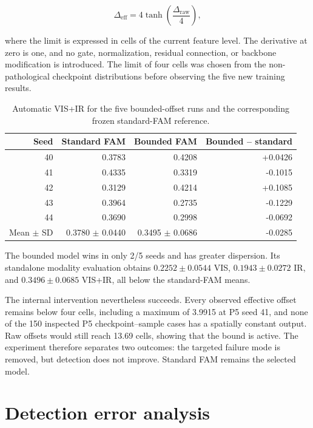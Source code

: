 \begin{equation}
  \Delta_{\mathrm{eff}}=4\tanh\!\left(\frac{\Delta_{\mathrm{raw}}}{4}\right),
  \label{eq:bounded-offset}
\end{equation}

where the limit is expressed in cells of the current feature level. The
derivative at zero is one, and no gate, normalization, residual connection, or
backbone modification is introduced. The limit of four cells was chosen from
the non-pathological checkpoint distributions before observing the five new
training results.

\begin{table}[htbp]
  \centering
  \caption{Automatic VIS+IR \mapfifty{} for the five bounded-offset runs and
  the corresponding frozen standard-FAM reference.}
  \label{tab:bounded-raw}
  \begin{tabular}{rrrr}
    \toprule
    Seed & Standard FAM & Bounded FAM & Bounded -- standard \\
    \midrule
    40 & 0.3783 & 0.4208 & +0.0426 \\
    41 & 0.4335 & 0.3319 & -0.1015 \\
    42 & 0.3129 & 0.4214 & +0.1085 \\
    43 & 0.3964 & 0.2735 & -0.1229 \\
    44 & 0.3690 & 0.2998 & -0.0692 \\
    \midrule
    Mean \(\pm\) SD & 0.3780 \(\pm\) 0.0440 & 0.3495 \(\pm\) 0.0686 & -0.0285 \\
    \bottomrule
  \end{tabular}
\end{table}

The bounded model wins in only 2/5 seeds and has greater dispersion. Its
standalone modality evaluation obtains
\(0.2252\pm0.0544\) VIS,
\(0.1943\pm0.0272\) IR, and
\(0.3496\pm0.0685\) VIS+IR, all below the standard-FAM means.

The internal intervention nevertheless succeeds. Every observed effective
offset remains below four cells, including a maximum of 3.9915 at P5 seed 41,
and none of the 150 inspected P5 checkpoint--sample cases has a spatially
constant output. Raw offsets would still reach 13.69 cells, showing that the
bound is active. The experiment therefore separates two outcomes: the targeted
failure mode is removed, but detection does not improve. Standard FAM remains
the selected model.

\section{Detection error analysis}
\label{sec:error-analysis}

